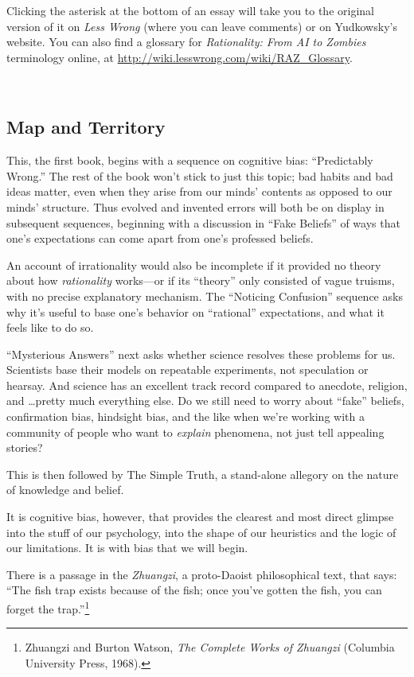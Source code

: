 \documentclass[letterpaper]{book}
\newcommand{\comment}[1]{
}
\begin{document}
{
 Clicking the asterisk at the bottom of an essay will take you to
the original version of it on \textit{Less Wrong} (where you can leave
comments) or on Yudkowsky's website. You can also find
a glossary for \textit{Rationality: From AI to Zombies} terminology
online, at \url{http://wiki.lesswrong.com/wiki/RAZ\_Glossary}.}

{
 ~}

\subsection{Map and Territory}

{
 This, the first book, begins with a sequence on cognitive bias:
``Predictably Wrong.'' The rest of
the book won't stick to just this topic; bad habits and
bad ideas matter, even when they arise from our minds'
contents as opposed to our minds' structure. Thus
evolved and invented errors will both be on display in subsequent
sequences, beginning with a discussion in ``Fake
Beliefs'' of ways that one's
expectations can come apart from one's professed
beliefs.}

{
 An account of irrationality would also be incomplete if it
provided no theory about how \textit{rationality} works---or if its
``theory'' only consisted of vague
truisms, with no precise explanatory mechanism. The
``Noticing Confusion'' sequence asks
why it's useful to base one's behavior
on ``rational'' expectations, and
what it feels like to do so.}

{
 ``Mysterious Answers'' next
asks whether science resolves these problems for us. Scientists base
their models on repeatable experiments, not speculation or hearsay. And
science has an excellent track record compared to anecdote, religion,
and \ldots pretty much everything else. Do we still need to worry about
``fake'' beliefs, confirmation bias,
hindsight bias, and the like when we're working with a
community of people who want to \textit{explain} phenomena, not just
tell appealing stories?}

{
 This is then followed by The Simple Truth, a stand-alone allegory
on the nature of knowledge and belief.}

{
 It is cognitive bias, however, that provides the clearest and most
direct glimpse into the stuff of our psychology, into the shape of our
heuristics and the logic of our limitations. It is with bias that we
will begin.}

{
 There is a passage in the \textit{Zhuangzi}, a proto-Daoist
philosophical text, that says: ``The fish trap exists
because of the fish; once you've gotten the fish, you
can forget the trap.''\footnote{Zhuangzi and Burton Watson, \textit{The Complete Works of
Zhuangzi} (Columbia University Press, 1968).\comment{20}}}
\end{document}
